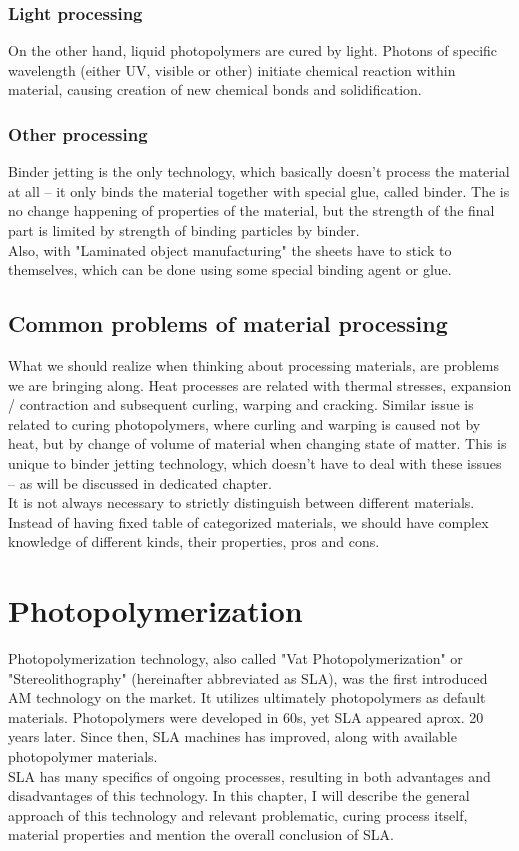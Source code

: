 \documentclass[a4paper, twoside, 11pt]{report}
\begin{document}
\subsection{Light processing}
On the other hand, liquid photopolymers are cured by light. Photons of specific wavelength (either UV, visible or other) initiate chemical reaction within material, causing creation of new chemical bonds and solidification.
\subsection{Other processing}
Binder jetting is the only technology, which basically doesn't process the material at all – it only binds the material together with special glue, called binder. The is no change happening of properties of the material, but the strength of the final part is limited by strength of binding particles by binder.\\
Also, with "Laminated object manufacturing" the sheets have to stick to themselves, which can be done using some special binding agent or glue.

\section{Common problems of material processing}
What we should realize when thinking about processing materials, are problems we are bringing along. Heat processes are related with thermal stresses, expansion / contraction and subsequent curling, warping and cracking. Similar issue is related to curing photopolymers, where curling and warping is caused not by heat, but by change of volume of material when changing state of matter. This is unique to binder jetting technology, which doesn't have to deal with these issues – as will be discussed in dedicated chapter.\\
It is not always necessary to strictly distinguish between different materials. Instead of having fixed table of categorized materials, we should have complex knowledge of different kinds, their properties, pros and cons. 

\chapter{Photopolymerization}
Photopolymerization technology, also called "Vat Photopolymerization" or "Stereolithography" (hereinafter abbreviated as SLA), was the first introduced AM technology on the market. It utilizes ultimately photopolymers as default materials. Photopolymers were developed in 60s, yet SLA appeared aprox. 20 years later. Since then, SLA machines has improved, along with available photopolymer materials.\\
SLA has many specifics of ongoing processes, resulting in both advantages and disadvantages of this technology. In this chapter, I will describe the general approach of this technology and relevant problematic, curing process itself, material properties and mention the overall conclusion of SLA.
\end{document}
